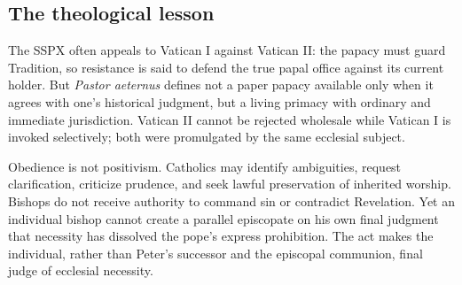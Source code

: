 \subsection{The theological lesson}

The SSPX often appeals to Vatican I against Vatican II: the papacy must guard Tradition, so resistance is said to defend the true papal office against its current holder. But \emph{Pastor aeternus} defines not a paper papacy available only when it agrees with one's historical judgment, but a living primacy with ordinary and immediate jurisdiction. Vatican II cannot be rejected wholesale while Vatican I is invoked selectively; both were promulgated by the same ecclesial subject.

Obedience is not positivism. Catholics may identify ambiguities, request clarification, criticize prudence, and seek lawful preservation of inherited worship. Bishops do not receive authority to command sin or contradict Revelation. Yet an individual bishop cannot create a parallel episcopate on his own final judgment that necessity has dissolved the pope's express prohibition. The act makes the individual, rather than Peter's successor and the episcopal communion, final judge of ecclesial necessity.

